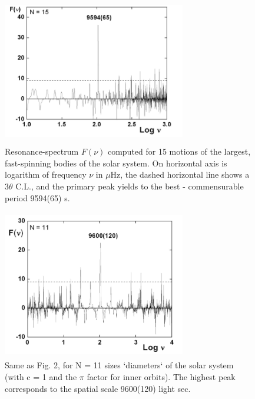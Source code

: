 \documentclass[twoside,draft]{article}
\begin{document}
{\begin{figure}
\centering
\includegraphics[width=8cm,height=6.5cm]{./figures/figure1}
\caption{Resonance-spectrum $F(\nu)$ computed for 15 motions of the largest, fast-spinning bodies of
the solar system. On horizontal axis is logarithm of frequency $\nu$ in $\mu$Hz, the dashed horizontal line
shows a $ 3 \theta $ C.L., and the primary peak yields to the best - commensurable period 9594(65) s.}
\label{fig:figure_label}
\end{figure}

\begin{figure}
\centering
\includegraphics[width=8cm,height=6.5cm]{./figures/figure2}
\caption{Same as Fig. 2, for N = 11 sizes `diameters` of the solar system (with c = 1 and the $\pi$
factor for inner orbits). The highest peak corresponds to the spatial scale 9600(120) light sec.}
\label{fig:figure_label}
\end{figure}

}
\end{document}
